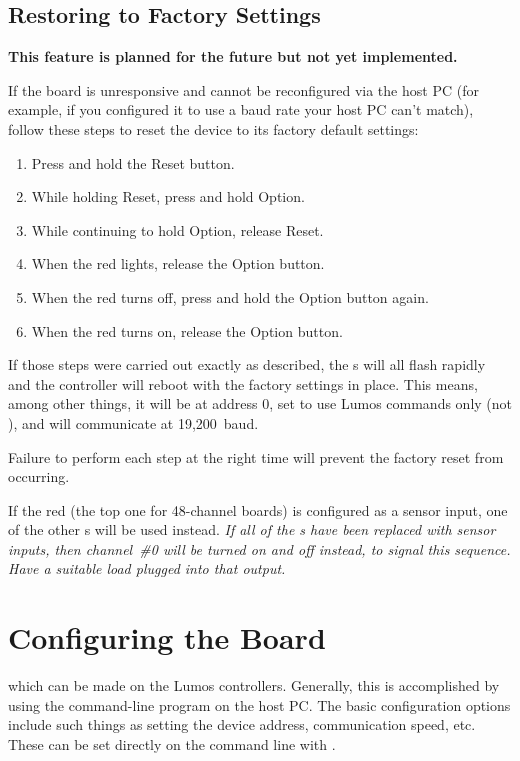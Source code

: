 \documentclass[letterpaper,twoside,onecolumn,openright,final]{memoir}
\begin{document}
\section{Restoring to Factory Settings}
{\bfseries This feature is planned for the future but not yet implemented.}
{\color{gray}
If the board is unresponsive and cannot be reconfigured via the host PC (for example, if you configured
it to use a baud rate your host PC can't match), follow these steps to reset the device to its 
factory default settings:
\begin{enumerate}
	\item	Press and hold the Reset button.
	\item	While holding Reset, press and hold Option.
	\item	While continuing to hold Option, release Reset.
	\item	When the red  lights, release the Option button.
	\item	When the red  turns off, press and hold the Option button again.
	\item	When the red  turns on, release the Option button.
\end{enumerate}

If those steps were carried out exactly as described, the s will all flash rapidly 
and the controller will reboot with the factory settings in place.  This means, among other things,
it will be at address 0, set to use Lumos commands only (not ), and will communicate
at 19,200~baud.

Failure to perform each step at the right time will prevent the factory reset from occurring.

 If the red  (the top one for 48-channel boards) is configured as a
sensor input, one of the other s will be used instead.  \emph{If all of the 
s have been replaced with sensor inputs, then channel~\#0 will be turned on
and off instead, to signal this sequence.  Have a suitable load plugged into that output.}
}

\chapter{Configuring the Board}
 which can be made on the Lumos controllers.  Generally,
this is accomplished by using the  com\-mand-line program on the host PC.  The basic configuration
options include such things as setting the device address, communication speed, etc.  These can be set
directly on the command line with .
\end{document}
